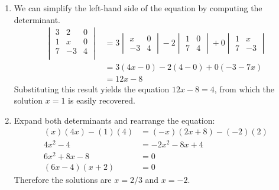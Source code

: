 \begin{enumerate}
\item We can simplify the left-hand side of the equation by computing the determinant.
\begin{align*}
  \begin{vmatrix}
   3 &  2 &  0 \\
   1 &  x &  0 \\
   7 & -3 &  4 \\
  \end{vmatrix}
 &=
  3 \begin{vmatrix} x & 0 \\ -3 & 4 \end{vmatrix} -
  2 \begin{vmatrix} 1 & 0 \\ 7 & 4 \end{vmatrix} +
  0 \begin{vmatrix} 1 & x \\ 7 & -3 \end{vmatrix} \\
 &=
  3(4x - 0) - 2(4 - 0) + 0(-3 -7x) \\
 &=
  12x - 8
\end{align*}
Substituting this result yields the equation $12x - 8 = 4$, from which the 
solution $x = 1$ is easily recovered.
\item
Expand both determinants and rearrange the equation:
\begin{align*}
 (x)(4x) - (1)(4) &= (-x)(2x+8) - (-2)(2) \\
 4x^2 - 4 &= -2x^2 - 8x + 4 \\
 6x^2 + 8x - 8 &= 0 \\
 (6x - 4)(x + 2) &= 0
\end{align*}
Therefore the solutions are $x = 2/3$ and $x = -2$.
\end{enumerate}


\EEN %
